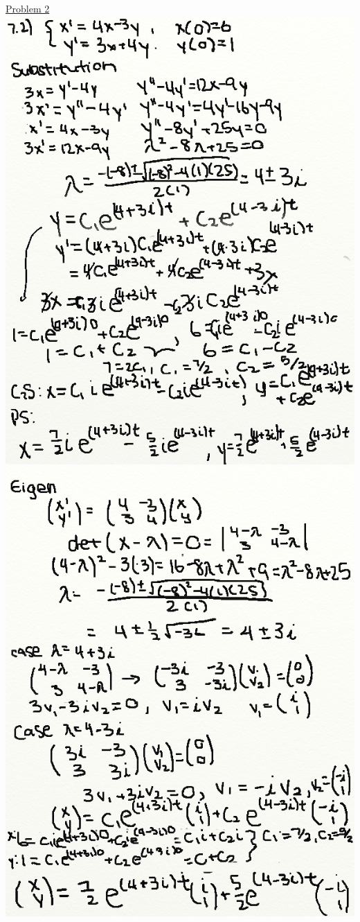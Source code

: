 \documentclass{article}
\begin{document}
\underline{Problem 2}\newline{}
\includegraphics[width=\textwidth,height=\textheight,keepaspectratio]{homework7q2p1.png}\clearpage{}
\includegraphics[width=\textwidth,height=\textheight,keepaspectratio]{homework7q2p2.png}\clearpage{}
\end{document}
